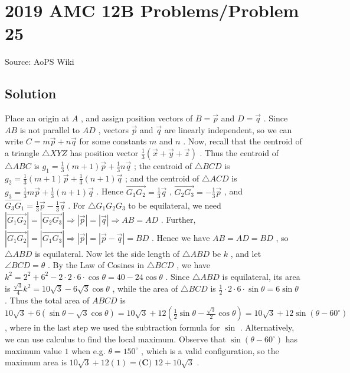 \documentclass[12pt]{article}
\begin{document}
\section*{{2019 AMC 12B Problems/Problem 25}}
Source: AoPS Wiki

\subsection*{Solution}
Place an origin at $A$ , and assign position vectors of $B = \vec{p}$ and $D = \vec{q}$ . Since $AB$ is not parallel to $AD$ , vectors $\vec{p}$ and $\vec{q}$ are linearly independent, so we can write $C = m\vec{p} + n\vec{q}$ for some constants $m$ and $n$ . Now, recall that the centroid of a triangle $\triangle XYZ$ has position vector $\frac{1}{3}\left(\vec{x}+\vec{y}+\vec{z}\right)$ . Thus the centroid of $\triangle ABC$ is $g_1 = \frac{1}{3}(m+1)\vec{p} + \frac{1}{3}n\vec{q}$ ; the centroid of $\triangle BCD$ is $g_2 = \frac{1}{3}(m+1)\vec{p} + \frac{1}{3}(n+1)\vec{q}$ ; and the centroid of $\triangle ACD$ is $g_3 = \frac{1}{3}m\vec{p} + \frac{1}{3}(n+1)\vec{q}$ . Hence $\overrightarrow{G_{1}G_{2}} = \frac{1}{3}\vec{q}$ , $\overrightarrow{G_{2}G_{3}} = -\frac{1}{3}\vec{p}$ , and $\overrightarrow{G_{3}G_{1}} = \frac{1}{3}\vec{p} - \frac{1}{3}\vec{q}$ . For $\triangle G_{1}G_{2}G_{3}$ to be equilateral, we need $\left|\overrightarrow{G_{1}G_{2}}\right| = \left|\overrightarrow{G_{2}G_{3}}\right| \Rightarrow \left|\vec{p}\right| = \left|\vec{q}\right| \Rightarrow AB = AD$ . Further, $\left|\overrightarrow{G_{1}G_{2}}\right| = \left|\overrightarrow{G_{1}G_{3}}\right| \Rightarrow \left|\vec{p}\right| = \left|\vec{p} - \vec{q}\right| = BD$ . Hence we have $AB = AD = BD$ , so $\triangle ABD$ is equilateral. Now let the side length of $\triangle ABD$ be $k$ , and let $\angle BCD = \theta$ . By the Law of Cosines in $\triangle BCD$ , we have $k^2 = 2^2 + 6^2 - 2 \cdot 2 \cdot 6 \cdot \cos{\theta} = 40 - 24\cos{\theta}$ . Since $\triangle ABD$ is equilateral, its area is $\frac{\sqrt{3}}{4}k^2 = 10\sqrt{3} - 6\sqrt{3}\cos{\theta}$ , while the area of $\triangle BCD$ is $\frac{1}{2} \cdot 2 \cdot 6 \cdot \sin{\theta} = 6 \sin{\theta}$ . Thus the total area of $ABCD$ is $10\sqrt{3} + 6\left(\sin{\theta} - \sqrt{3}\cos{\theta}\right) = 10\sqrt{3} + 12\left(\frac{1}{2} \sin{\theta} - \frac{\sqrt{3}}{2}\cos{\theta}\right) = 10\sqrt{3}+12\sin{\left(\theta-60^{\circ}\right)}$ , where in the last step we used the subtraction formula for $\sin$ . Alternatively, we can use calculus to find the local maximum. Observe that $\sin{\left(\theta-60^{\circ}\right)}$ has maximum value $1$ when e.g. $\theta = 150^{\circ}$ , which is a valid configuration, so the maximum area is $10\sqrt{3} + 12(1) = \boxed{\textbf{(C) } 12+10\sqrt3}$ .
\end{document}
